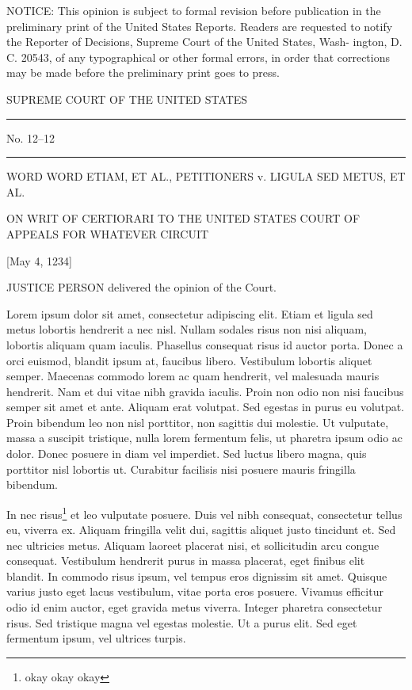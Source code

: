 \documentclass[twoside]{article}
\begin{document}
  \scriptsize NOTICE: This opinion is subject to formal revision before
  publication in the preliminary print of the United States Reports.
  Readers are requested to notify the Reporter of Decisions, Supreme
  Court of the United States, Wash- ington, D. C. 20543, of any
  typographical or other formal errors, in order that corrections may
  be made before the preliminary print goes to press. \normalsize

\begin{center}

  \large SUPREME COURT OF THE UNITED STATES \normalsize

  \rule{2cm}{.4pt}

  \small No. 12--12 \normalsize

  \rule{2cm}{.4pt}

  WORD WORD ETIAM, ET AL., PETITIONERS v. LIGULA SED METUS, ET AL.

  \vspace{1ex}

  \small ON WRIT OF CERTIORARI TO THE UNITED STATES COURT OF APPEALS FOR WHATEVER CIRCUIT \normalsize

  \vspace{1ex}

  [May 4, 1234]

\end{center}


JUSTICE PERSON delivered the opinion of the Court.

Lorem ipsum dolor sit amet, consectetur adipiscing elit. Etiam et ligula sed metus lobortis hendrerit a nec nisl. Nullam sodales risus non nisi aliquam, lobortis aliquam quam iaculis. Phasellus consequat risus id auctor porta. Donec a orci euismod, blandit ipsum at, faucibus libero. Vestibulum lobortis aliquet semper. Maecenas commodo lorem ac quam hendrerit, vel malesuada mauris hendrerit. Nam et dui vitae nibh gravida iaculis. Proin non odio non nisi faucibus semper sit amet et ante. Aliquam erat volutpat. Sed egestas in purus eu volutpat. Proin bibendum leo non nisl porttitor, non sagittis dui molestie. Ut vulputate, massa a suscipit tristique, nulla lorem fermentum felis, ut pharetra ipsum odio ac dolor. Donec posuere in diam vel imperdiet. Sed luctus libero magna, quis porttitor nisl lobortis ut. Curabitur facilisis nisi posuere mauris fringilla bibendum.

In nec risus\footnote{okay okay okay}
et leo vulputate posuere. Duis vel nibh consequat, consectetur tellus eu, viverra ex. Aliquam fringilla velit dui, sagittis aliquet justo tincidunt et. Sed nec ultricies metus. Aliquam laoreet placerat nisi, et sollicitudin arcu congue consequat. Vestibulum hendrerit purus in massa placerat, eget finibus elit blandit. In commodo risus ipsum, vel tempus eros dignissim sit amet. Quisque varius justo eget lacus vestibulum, vitae porta eros posuere. Vivamus efficitur odio id enim auctor, eget gravida metus viverra. Integer pharetra consectetur risus. Sed tristique magna vel egestas molestie. Ut a purus elit. Sed eget fermentum ipsum, vel ultrices turpis.
\end{document}
